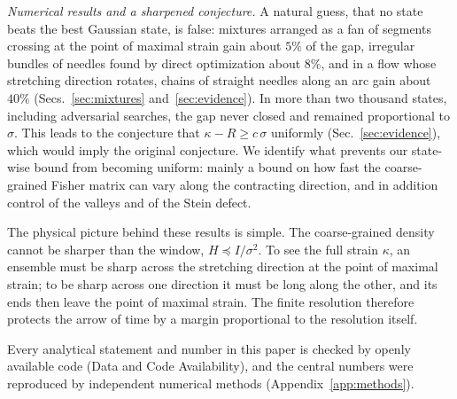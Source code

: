 \emph{Numerical results and a sharpened conjecture.} A natural guess, that no state beats the best Gaussian state, is false: mixtures arranged as a fan of segments crossing at the point of maximal strain gain about $5\%$ of the gap, irregular bundles of needles found by direct optimization about $8\%$, and in a flow whose stretching direction rotates, chains of straight needles along an arc gain about $40\%$ (Secs.~\ref{sec:mixtures} and~\ref{sec:evidence}). In more than two thousand states, including adversarial searches, the gap never closed and remained proportional to $\sigma$. This leads to the conjecture that $\kappa - R \geq c\,\sigma$ uniformly (Sec.~\ref{sec:evidence}), which would imply the original conjecture. We identify what prevents our state-wise bound from becoming uniform: mainly a bound on how fast the coarse-grained Fisher matrix can vary along the contracting direction, and in addition control of the valleys and of the Stein defect.

The physical picture behind these results is simple. The coarse-grained density cannot be sharper than the window, $H \preceq I/\sigma^2$. To see the full strain $\kappa$, an ensemble must be sharp across the stretching direction at the point of maximal strain; to be sharp across one direction it must be long along the other, and its ends then leave the point of maximal strain. The finite resolution therefore protects the arrow of time by a margin proportional to the resolution itself.

Every analytical statement and number in this paper is checked by openly available code (Data and Code Availability), and the central numbers were reproduced by independent numerical methods (Appendix~\ref{app:methods}).
